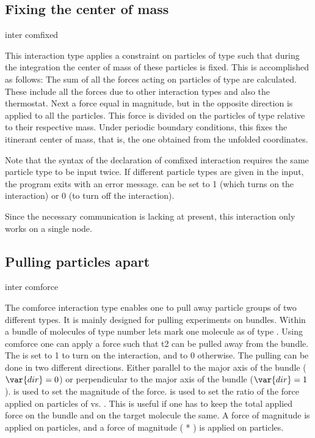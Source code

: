 \subsection{Fixing the center of mass}
\begin{essyntax}
  inter   comfixed 
  \begin{features}
  \end{features}
\end{essyntax}
This interaction type applies a constraint on particles of type
 such that during the integration the center of mass of
these particles is fixed. This is accomplished as follows: The sum of
all the forces acting on particles of type  are
calculated. These include all the forces due to other interaction
types and also the thermostat. Next a force equal in magnitude, but in
the opposite direction is applied to all the particles. This force is
divided on the particles of type  relative to
their respective mass. Under periodic boundary conditions, this fixes
the itinerant center of mass, that is, the one obtained from the
unfolded coordinates.

Note that the syntax of the
declaration of comfixed interaction requires the same particle type to
be input twice. If different particle types are given in the input,
the program exits with an error message.  can be set to 1
(which turns on the interaction) or 0 (to turn off the interaction).


Since the necessary communication is lacking at present, this interaction
only works on a single node.

\subsection{Pulling particles apart}
\begin{essyntax}
  inter  
  comforce    
  \begin{features}
  \end{features}
\end{essyntax}
The comforce interaction type enables one to pull away particle groups
of two different types. It is mainly designed for pulling experiments
on bundles. Within a bundle of molecules of type number 
lets mark one molecule as of type . Using comforce one
can apply a force such that t2 can be pulled away from the bundle. The
 is set to 1 to turn on the interaction, and to 0
otherwise. The pulling can be done in two different directions. Either
parallel to the major axis of the bundle ($\var{dir} = 0$) or
perpendicular to the major axis of the bundle ($\var{dir} = 1$).
 is used to set the magnitude of the force.  
is used to set the ratio of the force applied on particles of
 vs. . This is useful if one has to keep the
total applied force on the bundle and on the target molecule the same.
A force of magnitude  is applied on 
particles, and a force of magnitude ( * ) is
applied on  particles.

